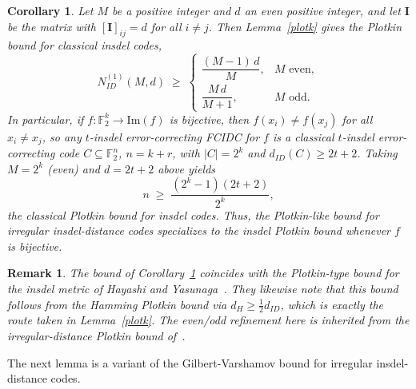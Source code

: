 \documentclass[11 pt]{article}
\numberwithin{equation}{section}
\newtheorem{corollary}[theorem]{Corollary}
\newtheorem{remark}[theorem]{Remark}
\begin{document}
    \begin{corollary}
    \label{cor:plotkin-insdel}
    Let $M$ be a positive integer and $d$ an even positive integer, and let $\mathbf{I}$ be the matrix with $[\mathbf{I}]_{ij} = d$ for all $i \neq j$. Then Lemma~\ref{plotk} gives the Plotkin bound for classical insdel codes,
    \[
    N^{(1)}_{ID}(M, d) \;\geq\;
    \begin{cases}
    \dfrac{(M-1)\,d}{M}, & M \text{ even},\\[1.4ex]
    \dfrac{M\,d}{M+1}, & M \text{ odd}.
    \end{cases}
    \]
    In particular, if $f : \mathbb{F}_2^k \to \mathrm{Im}(f)$ is bijective, then $f(x_i) \neq f(x_j)$ for all $x_i \neq x_j$, so any $t$-insdel error-correcting FCIDC for $f$ is a classical $t$-insdel error-correcting code $C \subseteq \mathbb{F}_2^{n}$, $n = k + r$, with $|C| = 2^k$ and $d_{ID}(C) \geq 2t + 2$. Taking $M = 2^k$ (even) and $d = 2t+2$ above yields
    \[
    n \;\geq\; \frac{(2^k - 1)(2t + 2)}{2^k},
    \]
    the classical Plotkin bound for insdel codes. Thus, the Plotkin-like bound for irregular insdel-distance codes specializes to the insdel Plotkin bound whenever $f$ is bijective.
    \end{corollary}

    

    \begin{remark}
    The bound of Corollary~\ref{cor:plotkin-insdel} coincides with the Plotkin-type bound for the insdel metric of Hayashi and Yasunaga~\cite[Thm.~4]{hayashi2020list}. They likewise note that this bound follows from the Hamming Plotkin bound via $d_H \ge \tfrac12 d_{ID}$, which is exactly the route taken in Lemma~\ref{plotk}. The even/odd refinement here is inherited from the irregular-distance Plotkin bound of~\cite{10132545}.
    \end{remark}
    
    
    The next lemma is a variant of the Gilbert-Varshamov bound for irregular insdel-distance codes.
    
\end{document}
